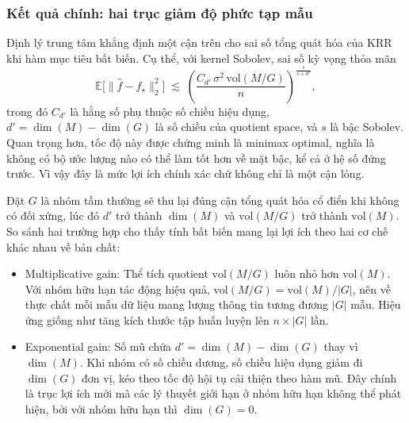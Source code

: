 \subsubsection{Kết quả chính: hai trục giảm độ phức tạp mẫu}
 
Định lý trung tâm khẳng định một cận trên cho sai số tổng quát hóa của KRR khi hàm mục tiêu bất biến. Cụ thể, với kernel Sobolev, sai số kỳ vọng thỏa mãn
\begin{equation}
    \mathbb{E}\bigl[\|\hat{f} - f_{\star}\|_2^2\bigr] \;\lesssim\; \left( \frac{C_{d'}\, \sigma^2\, \mathrm{vol}(M/G)}{n} \right)^{\frac{s}{s+d'}},
\end{equation}
trong đó $C_{d'}$ là hằng số phụ thuộc số chiều hiệu dụng, $d' = \dim(M) - \dim(G)$ là số chiều của quotient space, và $s$ là bậc Sobolev. Quan trọng hơn, tốc độ này được chứng minh là minimax optimal, nghĩa là không có bộ ước lượng nào có thể làm tốt hơn về mặt bậc, kể cả ở hệ số đứng trước. Vì vậy đây là mức lợi ích chính xác chứ không chỉ là một cận lỏng.
 
Đặt $G$ là nhóm tầm thường sẽ thu lại đúng cận tổng quát hóa cổ điển khi không có đối xứng, lúc đó $d'$ trở thành $\dim(M)$ và $\mathrm{vol}(M/G)$ trở thành $\mathrm{vol}(M)$. So sánh hai trường hợp cho thấy tính bất biến mang lại lợi ích theo hai cơ chế khác nhau về bản chất:
 
\begin{itemize}
    \item Multiplicative gain: Thể tích quotient $\mathrm{vol}(M/G)$ luôn nhỏ hơn $\mathrm{vol}(M)$. Với nhóm hữu hạn tác động hiệu quả, $\mathrm{vol}(M/G) = \mathrm{vol}(M)/|G|$, nên về thực chất mỗi mẫu dữ liệu mang lượng thông tin tương đương $|G|$ mẫu. Hiệu ứng giống như tăng kích thước tập huấn luyện lên $n \times |G|$ lần.
    \item Exponential gain: Số mũ chứa $d' = \dim(M) - \dim(G)$ thay vì $\dim(M)$. Khi nhóm có số chiều dương, số chiều hiệu dụng giảm đi $\dim(G)$ đơn vị, kéo theo tốc độ hội tụ cải thiện theo hàm mũ. Đây chính là trục lợi ích mới mà các lý thuyết giới hạn ở nhóm hữu hạn không thể phát hiện, bởi với nhóm hữu hạn thì $\dim(G) = 0$.
\end{itemize}
 

